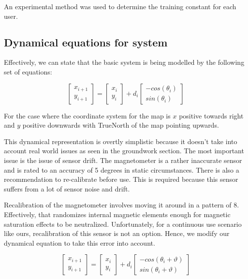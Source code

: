 An experimental method was used to determine the training constant for each
user.


\subsection{Dynamical equations for system}

Effectively, we can state that the basic system is being modelled by the
following set of equations:

\begin{equation}\label{eq:dr_eq}
\begin{bmatrix}x_{i+1}\\
y_{i+1}
\end{bmatrix} = \begin{bmatrix}x_{i}\\
y_{i}
\end{bmatrix}  + d{}_{i} \begin{bmatrix}-cos(\theta_{i})\\
sin(\theta_{i})
\end{bmatrix} 
\end{equation}

For the case where the coordinate system for the map is $x$ positive towards right and $y$  positive downwards with TrueNorth  of the map pointing upwards.

This dynamical representation is overtly simplistic because it doesn't take into account real world issues as seen in the groundwork section. The most important issue is the issue of sensor drift. The magnetometer is a rather inaccurate sensor and is rated to an accuracy of 5 degrees in static circumstances. There is also a recommendation to re-calibrate before use. This is required because this sensor suffers from a lot of sensor noise and drift. 

Recalibration of the magnetometer involves moving it around in a pattern of 8. Effectively, that randomizes internal magnetic elements enough for magnetic saturation effects to be neutralized. Unfortunately, for a continuous use scenario like ours, recalibration of this sensor is not an option. Hence, we modify our dynamical equation to take this error into account.

\begin{equation}
\begin{bmatrix}x_{i+1}\\
y_{i+1}
\end{bmatrix} = \begin{bmatrix}x_{i}\\
y_{i}
\end{bmatrix}  + d{}_{i} \begin{bmatrix}-cos(\theta_{i}+\vartheta)\\
sin(\theta_{i}+\vartheta)
\end{bmatrix} 
\end{equation}

